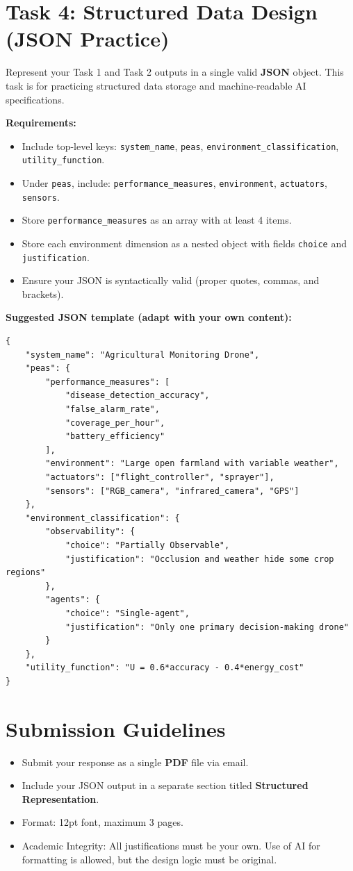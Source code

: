 \documentclass[11pt]{article}
\begin{document}
\section{Task 4: Structured Data Design (JSON Practice)}
Represent your Task 1 and Task 2 outputs in a single valid \textbf{JSON} object. This task is for practicing structured data storage and machine-readable AI specifications.

\vspace{0.2cm}
\textbf{Requirements:}
\begin{itemize}
        \item Include top-level keys: \texttt{system\_name}, \texttt{peas}, \texttt{environment\_classification}, \texttt{utility\_function}.
        \item Under \texttt{peas}, include: \texttt{performance\_measures}, \texttt{environment}, \texttt{actuators}, \texttt{sensors}.
        \item Store \texttt{performance\_measures} as an array with at least 4 items.
        \item Store each environment dimension as a nested object with fields \texttt{choice} and \texttt{justification}.
        \item Ensure your JSON is syntactically valid (proper quotes, commas, and brackets).
\end{itemize}

\vspace{0.15cm}
\textbf{Suggested JSON template (adapt with your own content):}
\begin{verbatim}
{
    "system_name": "Agricultural Monitoring Drone",
    "peas": {
        "performance_measures": [
            "disease_detection_accuracy",
            "false_alarm_rate",
            "coverage_per_hour",
            "battery_efficiency"
        ],
        "environment": "Large open farmland with variable weather",
        "actuators": ["flight_controller", "sprayer"],
        "sensors": ["RGB_camera", "infrared_camera", "GPS"]
    },
    "environment_classification": {
        "observability": {
            "choice": "Partially Observable",
            "justification": "Occlusion and weather hide some crop regions"
        },
        "agents": {
            "choice": "Single-agent",
            "justification": "Only one primary decision-making drone"
        }
    },
    "utility_function": "U = 0.6*accuracy - 0.4*energy_cost"
}
\end{verbatim}

\section{Submission Guidelines}
\begin{itemize}
    \item Submit your response as a single \textbf{PDF} file via email.
    \item Include your JSON output in a separate section titled \textbf{Structured Representation}.
    \item Format: 12pt font, maximum 3 pages.
    \item Academic Integrity: All justifications must be your own. Use of AI for formatting is allowed, but the design logic must be original.
\end{itemize}
\end{document}

